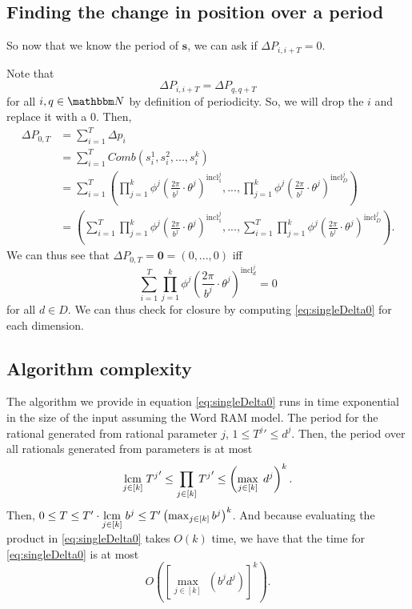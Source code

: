 \documentclass[11pt,titlepage]{article}
\newcommand{\rationalPeriod}{{T^j}'}
\newcommand{\rationalPeriodTotal}{{T}'}
\newcommand{\totalPeriod}{T}
\newcommand{\totalStateNotime}{\pmb{s}}
\newcommand{\combWithState}[1]{Comb\left(s^1_{#1}, s^2_{#1}, ..., s^k_{#1}\right)}
\newcommand{\inclIndic}[2]{{\mathrm{incl}_{#1}^{#2}}}
\newcommand{\numbToAngle}{\frac{2\pi}{b^j}}
\newcommand{\sinOrCos}{\phi^j}
\newcommand{\combSingleTerm}[1]{\prod_{j=1}^k \sinOrCos\left(\numbToAngle \cdot \theta^j\right) ^ {\inclIndic{#1}{j}}}
\begin{document}



\subsection{Finding the change in position over a period}
So now that we know the period of $\totalStateNotime$, we can ask if
$\Delta P_{i, i + T} = 0$. %

Note that 
$$
\Delta P_{i, i + T} = \Delta P_{q, q + T}
$$
for all $i, q \in \N$ by definition of periodicity.
So, we will drop the $i$ and replace it with a $0$.
Then,
\begin{align*}
  \Delta P_{0, T} &= \sum_{i = 1}^T \Delta p_i \\
  &= \sum_{i = 1}^T \combWithState{i} \\
  &= \sum_{i = 1}^T \left(\combSingleTerm{1}, ..., \combSingleTerm{D}\right) \\
  &= \left(\sum_{i = 1}^T \combSingleTerm{1}, ..., \sum_{i = 1}^T \combSingleTerm{D}\right).
\end{align*}
We can thus see that $\Delta P_{0, T} = \pmb{0} = (0, ..., 0)$ iff 
\begin{equation}
\label{eq:singleDelta0}
\sum_{i = 1}^T \combSingleTerm{d} = 0
\end{equation}
for all $d \in D$.
We can thus check for closure by computing \eqref{eq:singleDelta0} for each dimension.

\subsection{Algorithm complexity}
The algorithm we provide in equation \eqref{eq:singleDelta0} runs in time exponential 
in the size of the input assuming the Word RAM model. 
The period for the rational generated from rational parameter $j$, $1 \leq \rationalPeriod \leq d^j$. Then,
the period over all rationals generated from parameters is at most 
$$
  \lcm{j \in [k]} \rationalPeriod \leq \prod_{j \in [k]} \rationalPeriod \leq \left(\max_{j \in [k]} \; d^j \right)^k.
$$
Then, 
$0 \leq \totalPeriod \leq \rationalPeriodTotal \cdot \lcm{j \in [k]} b^j \leq \rationalPeriodTotal \left(\max_{j \in [k]} b^j\right)^k$.
And because evaluating the product in \eqref{eq:singleDelta0} takes $O(k)$ time,
we have that the time for \eqref{eq:singleDelta0} is at most
$$
  O\left(\left[\max_{j \in [k]} \; (b^j d^j)\right]^k \right).
$$
\end{document}
